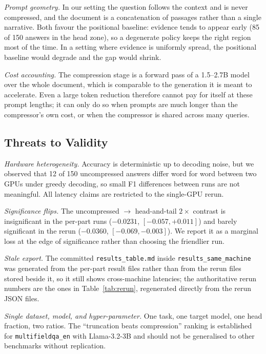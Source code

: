 \documentclass[10pt,a4paper,twocolumn]{article}
\begin{document}
\emph{Prompt geometry.} In our setting the question follows the context and is
never compressed, and the document is a concatenation of passages rather than a
single narrative. Both favour the positional baseline: evidence tends to appear
early (85 of 150 answers in the head zone), so a degenerate policy keeps the right
region most of the time. In a setting where evidence is uniformly spread, the
positional baseline would degrade and the gap would shrink.

\emph{Cost accounting.} The compression stage is a forward pass of a 1.5--2.7B
model over the whole document, which is comparable to the generation it is meant
to accelerate. Even a large token reduction therefore cannot pay for itself at these
prompt lengths; it can only do so when prompts are much longer than the
compressor's own cost, or when the compressor is shared across many queries.

\subsection{Threats to Validity}

\emph{Hardware heterogeneity.} Accuracy is deterministic up to decoding noise, but
we observed that 12 of 150 uncompressed answers differ word for word between two
GPUs under greedy decoding, so small F1 differences between runs are not meaningful.
All latency claims are restricted to the single-GPU rerun.

\emph{Significance flips.} The uncompressed $\rightarrow$ head-and-tail $2\times$
contrast is insignificant in the per-part runs ($-0.0231$, $[-0.057,+0.011]$) and
barely significant in the rerun ($-0.0360$, $[-0.069,-0.003]$). We report it as a
marginal loss at the edge of significance rather than choosing the friendlier run.

\emph{Stale export.} The committed \texttt{results\_table.md} inside
\texttt{results\_same\_machine} was generated from the per-part result files
rather than from the rerun files stored beside it, so it still shows cross-machine
latencies; the authoritative rerun numbers are the ones in Table~\ref{tab:rerun},
regenerated directly from the rerun JSON files.

\emph{Single dataset, model, and hyper-parameter.} One task, one target model, one
head fraction, two ratios. The ``truncation beats compression'' ranking is
established for \texttt{multifieldqa\_en} with Llama-3.2-3B and should not be
generalised to other benchmarks without replication.
\end{document}
